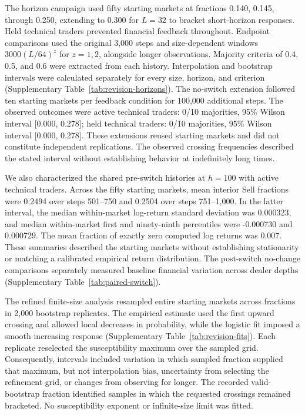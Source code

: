 The horizon campaign used fifty starting markets at fractions
0.140, 0.145, through 0.250, extending to 0.300 for $L=32$ to bracket
short-horizon responses. Held technical traders prevented financial
feedback throughout. Endpoint comparisons used the original 3,000 steps
and size-dependent windows $3000(L/64)^z$ for $z=1,2$, alongside longer
observations. Majority criteria of 0.4, 0.5, and 0.6 were extracted
from each history. Interpolation and bootstrap intervals were calculated
separately for every size, horizon, and criterion
(Supplementary Table~\ref{tab:revision-horizons}). The no-switch
extension followed ten starting markets per feedback condition for
100,000 additional steps. The observed outcomes were active technical traders: 0/10 majorities, 95\% Wilson interval [0.000, 0.278]; held technical traders: 0/10 majorities, 95\% Wilson interval [0.000, 0.278].
These extensions reused starting markets and did not constitute
independent replications. The observed crossing frequencies described
the stated interval without establishing behavior at indefinitely long
times.

We also characterized the shared pre-switch histories at $h=100$ with
active technical traders. Across the fifty starting markets, mean
interior Sell fractions were 0.2494 over
steps 501--750 and 0.2504 over steps
751--1,000. In the latter interval, the median within-market log-return
standard deviation was 0.000323, and
median within-market first and ninety-ninth percentiles were
-0.000730 and
0.000729. The mean fraction of exactly
zero computed log returns was 0.007.
These summaries described the starting markets without establishing
stationarity or matching a calibrated empirical return distribution.
The post-switch no-change comparisons separately measured baseline
financial variation across dealer depths
(Supplementary Table~\ref{tab:paired-switch}).

The refined finite-size analysis resampled entire starting markets across
fractions in 2,000 bootstrap replicates. The empirical estimate used the
first upward crossing and allowed local decreases in probability, while
the logistic fit imposed a smooth increasing response
(Supplementary Table~\ref{tab:revision-fits}). Each replicate reselected
the susceptibility maximum over the sampled grid. Consequently,
intervals included variation in which sampled fraction supplied that
maximum, but not interpolation bias, uncertainty from selecting the
refinement grid, or changes from observing for longer. The recorded
valid-bootstrap fraction identified samples in which the requested
crossings remained bracketed. No susceptibility exponent or
infinite-size limit was fitted.

